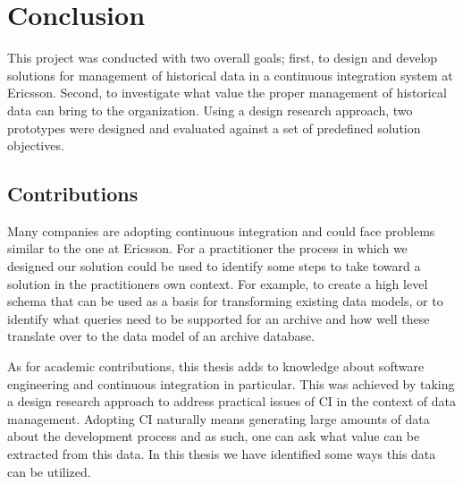 \chapter{Conclusion}
\label{chap:conclusion}
This project was conducted with two overall goals; first, to design and develop solutions for management of historical data in a continuous integration system at Ericsson. Second, to investigate what value the proper management of historical data can bring to the organization. Using a design research approach, two prototypes were designed and evaluated against a set of predefined solution objectives.



%
%


\section{Contributions}


Many companies are adopting continuous integration and could face problems similar to the one at Ericsson. For a practitioner the process in which we designed our solution could be used to identify some steps to take toward a solution in the practitioners own context. For example, to create a high level schema that can be used as a basis for transforming existing data models, or to identify what queries need to be supported for an archive and how well these translate over to the data model of an archive database.

As for academic contributions, this thesis adds to knowledge about software engineering and continuous integration in particular. This was achieved by taking a design research approach to address practical issues of CI in the context of data management. Adopting CI naturally means generating large amounts of data about the development process and as such, one can ask what value can be extracted from this data. In this thesis we have identified some ways this data can be utilized. 

